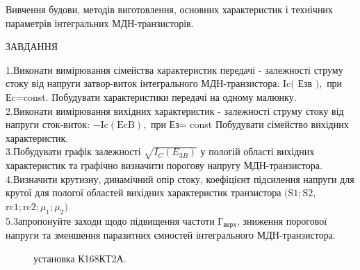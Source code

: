 \documentclass[a4paper,14pt]{extreport}
\begin{document}
Вивчення будови, методів виготовлення, основних характеристик і технічних параметрів інтегральних МДН-транзисторів.

\begin{center} ЗАВДАННЯ\\ \end{center}


1.Виконати вимірювання сімейства характеристик передачі - залежності струму стоку від напруги затвор-виток інтегрального МДН-транзистора: $\mathrm{Ic}($ Езв $),$ при Еc=const. Побудувати характеристики передачі на одному малюнку.\\

2.Виконати вимірювання вихідних характеристик - залежності струму стоку від напруги сток-виток: $-\mathrm{Ic}(\mathrm{EcB}),$ при Ез= const Побудувати сімейство вихідних характеристик.\\

3.Побудувати графік залежності $\sqrt{I_{C}\left(E_{3 B}\right)}$ у пологій області вихідних характеристик та графічно визначити порогову напругу МДН-транзистора.\\

4.Визначити крутизну, динамічний опір стоку, коефіцієнт підсилення напруги для крутої для пологої областей вихідних характеристик транзистора $(\mathrm{S} 1 ; \mathrm{S} 2,$ $ \mathrm{rc} 1 ; \mathrm{rc} 2 ; \mu_{1} ; \mu_{2})$\\

5.3апропонуйте заходи щодо підвищення частоти Г$_{\text{верх}}$, зниження порогової напруги та зменшення паразитних ємностей інтегрального МДН-транзистора.\\

\begin{figure}[h]
\caption{установка  К168КТ2А.}
\label{ris1}
\end{figure}
\end{document}
